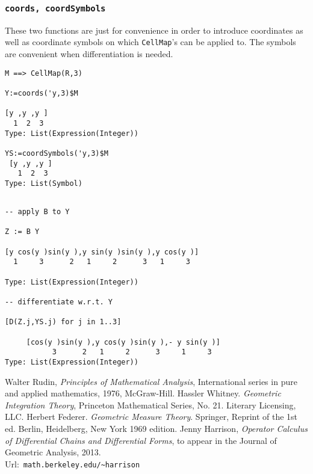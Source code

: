 \documentclass[12pt,a4paper]{article}
\begin{document}
\subsubsection{{\tt coords, coordSymbols}}
These two functions are just for convenience in order to introduce
coordinates as well as coordinate symbols on which {\tt CellMap}'s 
can be applied to. The symbols are convenient when differentiation
is needed.
\begin{lstlisting}
M ==> CellMap(R,3) 

Y:=coords('y,3)$M

[y ,y ,y ]
  1  2  3
Type: List(Expression(Integer))

YS:=coordSymbols('y,3)$M
 [y ,y ,y ]
   1  2  3
Type: List(Symbol)
\end{lstlisting}
\scriptsize
\begin{verbatim}

-- apply B to Y

Z := B Y

[y cos(y )sin(y ),y sin(y )sin(y ),y cos(y )]
  1     3      2   1     2      3   1     3

Type: List(Expression(Integer))

-- differentiate w.r.t. Y

[D(Z.j,YS.j) for j in 1..3]

     [cos(y )sin(y ),y cos(y )sin(y ),- y sin(y )]
           3      2   1     2      3     1     3
Type: List(Expression(Integer))
\end{verbatim}
\normalsize

% 
\begin{thebibliography}{1}
%
 Walter Rudin,
  {\em Principles of Mathematical Analysis},
  International series in pure and applied mathematics,
  1976, McGraw-Hill.
 Hassler Whitney. {\em Geometric Integration Theory},
  Princeton Mathematical Series, No. 21. Literary Licensing, LLC.
 Herbert Federer. {\em Geometric Measure Theory}. Springer,        
  Reprint of the 1st ed. Berlin, Heidelberg, New York 1969 edition.
 Jenny Harrison, {\em Operator Calculus of Differential
  Chains and Differential Forms}, to appear in the Journal of Geometric
  Analysis, 2013. \\
  Url:\ {\small {\tt math.berkeley.edu/\textasciitilde harrison}}
\end{thebibliography}
%
\end{document}
